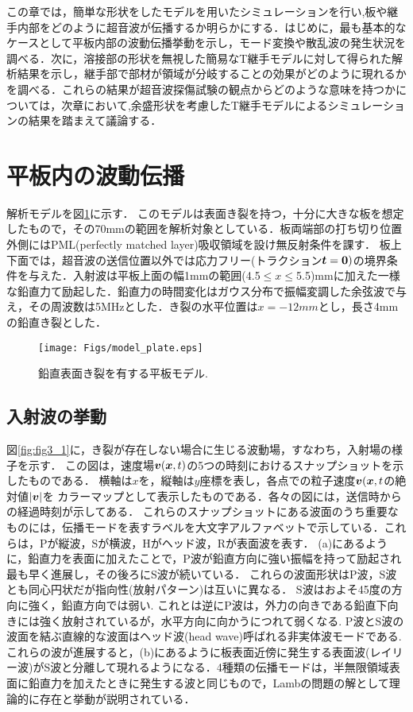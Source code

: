 ﻿%
この章では，簡単な形状をしたモデルを用いたシミュレーションを行い,板や継手内部をどのように超音波が伝播するか明らかにする．はじめに，最も基本的なケースとして平板内部の波動伝播挙動を示し，モード変換や散乱波の発生状況を調べる．次に，溶接部の形状を無視した簡易なT継手モデルに対して得られた解析結果を示し，継手部で部材が領域が分岐することの効果がどのように現れるかを調べる．これらの結果が超音波探傷試験の観点からどのような意味を持つかについては，次章において,余盛形状を考慮したT継手モデルによるシミュレーションの結果を踏まえて議論する．
\section{平板内の波動伝播}
解析モデルを図\ref{fig:fig3_00}に示す．
このモデルは表面き裂を持つ，十分に大きな板を想定したもので，その70mmの範囲を解析対象としている．板両端部の打ち切り位置外側にはPML(perfectly matched layer)吸収領域を設け無反射条件を課す．
板上下面では，超音波の送信位置以外では応力フリー(トラクション$\mbox{\boldmath $t$}=\mbox{\boldmath $0$})$の境界条件を与えた．入射波は平板上面の幅1mmの範囲(4.5$\leq x \leq $5.5)mmに加えた一様な鉛直力て励起した．鉛直力の時間変化はガウス分布で振幅変調した余弦波で与え，その周波数は5MHzとした．き裂の水平位置は$x=-12mm$とし，長さ4mmの鉛直き裂とした．
\begin{figure}[h]
	\begin{center}
	\texttt{[image: Figs/model\_plate.eps]} 
	\end{center}
	\caption{
		鉛直表面き裂を有する平板モデル.
	} 
	\label{fig:fig3_00}
\end{figure}
\subsection{入射波の挙動}
図\ref{fig:fig3_1}に，き裂が存在しない場合に生じる波動場，すなわち，入射場の様子を示す．
この図は，速度場$\mbox{\boldmath $v$}(\mbox{\boldmath $x$},t)$の5つの時刻におけるスナップショットを示したものである．
横軸は$x$を，縦軸は$y$座標を表し，各点での粒子速度$\mbox{\boldmath $v$}(\mbox{\boldmath $x$},t$の絶対値$|\mbox{\boldmath $v$}|$を
カラーマップとして表示したものである．各々の図には，送信時からの経過時刻が示してある．
これらのスナップショットにある波面のうち重要なものには，伝播モードを表すラベルを大文字アルファベットで示している．これらは，Pが縦波，Sが横波，Hがヘッド波，Rが表面波を表す．
(a)にあるように，鉛直力を表面に加えたことで，P波が鉛直方向に強い振幅を持って励起され最も早く進展し，その後ろにS波が続いている．
これらの波面形状はP波，S波とも同心円状だが指向性(放射パターン)は互いに異なる．
S波はおよそ45度の方向に強く，鉛直方向では弱い.
これとは逆にP波は，外力の向きである鉛直下向きには強く放射されているが，水平方向に向かうにつれて弱くなる.
P波とS波の波面を結ぶ直線的な波面はヘッド波(head wave)呼ばれる非実体波モードである.
これらの波が進展すると，(b)にあるように板表面近傍に発生する表面波(レイリー波)がS波と分離して現れるようになる．4種類の伝播モードは，半無限領域表面に鉛直力を加えたときに発生する波と同じもので，Lambの問題の解として理論的に存在と挙動が説明されている．

